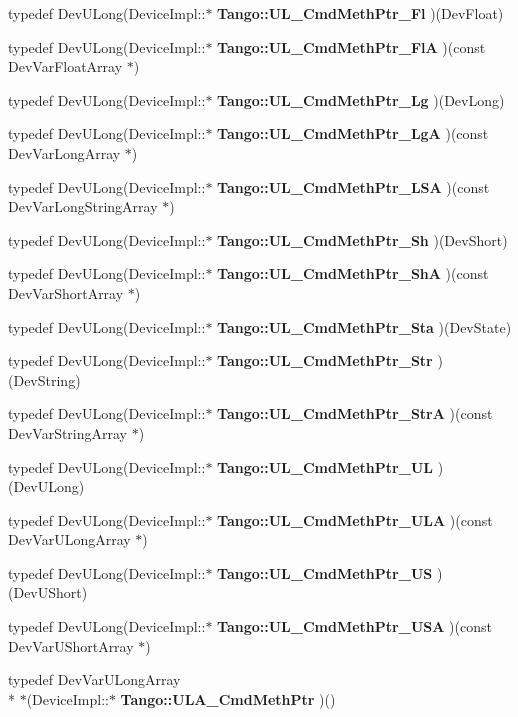\begin{DoxyCompactItemize}
\item 
typedef Dev\-U\-Long(Device\-Impl\-::$\ast$ {\bf Tango\-::\-U\-L\-\_\-\-Cmd\-Meth\-Ptr\-\_\-\-Fl} )(Dev\-Float)
\item 
typedef Dev\-U\-Long(Device\-Impl\-::$\ast$ {\bf Tango\-::\-U\-L\-\_\-\-Cmd\-Meth\-Ptr\-\_\-\-Fl\-A} )(const Dev\-Var\-Float\-Array $\ast$)
\item 
typedef Dev\-U\-Long(Device\-Impl\-::$\ast$ {\bf Tango\-::\-U\-L\-\_\-\-Cmd\-Meth\-Ptr\-\_\-\-Lg} )(Dev\-Long)
\item 
typedef Dev\-U\-Long(Device\-Impl\-::$\ast$ {\bf Tango\-::\-U\-L\-\_\-\-Cmd\-Meth\-Ptr\-\_\-\-Lg\-A} )(const Dev\-Var\-Long\-Array $\ast$)
\item 
typedef Dev\-U\-Long(Device\-Impl\-::$\ast$ {\bf Tango\-::\-U\-L\-\_\-\-Cmd\-Meth\-Ptr\-\_\-\-L\-S\-A} )(const Dev\-Var\-Long\-String\-Array $\ast$)
\item 
typedef Dev\-U\-Long(Device\-Impl\-::$\ast$ {\bf Tango\-::\-U\-L\-\_\-\-Cmd\-Meth\-Ptr\-\_\-\-Sh} )(Dev\-Short)
\item 
typedef Dev\-U\-Long(Device\-Impl\-::$\ast$ {\bf Tango\-::\-U\-L\-\_\-\-Cmd\-Meth\-Ptr\-\_\-\-Sh\-A} )(const Dev\-Var\-Short\-Array $\ast$)
\item 
typedef Dev\-U\-Long(Device\-Impl\-::$\ast$ {\bf Tango\-::\-U\-L\-\_\-\-Cmd\-Meth\-Ptr\-\_\-\-Sta} )(Dev\-State)
\item 
typedef Dev\-U\-Long(Device\-Impl\-::$\ast$ {\bf Tango\-::\-U\-L\-\_\-\-Cmd\-Meth\-Ptr\-\_\-\-Str} )(Dev\-String)
\item 
typedef Dev\-U\-Long(Device\-Impl\-::$\ast$ {\bf Tango\-::\-U\-L\-\_\-\-Cmd\-Meth\-Ptr\-\_\-\-Str\-A} )(const Dev\-Var\-String\-Array $\ast$)
\item 
typedef Dev\-U\-Long(Device\-Impl\-::$\ast$ {\bf Tango\-::\-U\-L\-\_\-\-Cmd\-Meth\-Ptr\-\_\-\-U\-L} )(Dev\-U\-Long)
\item 
typedef Dev\-U\-Long(Device\-Impl\-::$\ast$ {\bf Tango\-::\-U\-L\-\_\-\-Cmd\-Meth\-Ptr\-\_\-\-U\-L\-A} )(const Dev\-Var\-U\-Long\-Array $\ast$)
\item 
typedef Dev\-U\-Long(Device\-Impl\-::$\ast$ {\bf Tango\-::\-U\-L\-\_\-\-Cmd\-Meth\-Ptr\-\_\-\-U\-S} )(Dev\-U\-Short)
\item 
typedef Dev\-U\-Long(Device\-Impl\-::$\ast$ {\bf Tango\-::\-U\-L\-\_\-\-Cmd\-Meth\-Ptr\-\_\-\-U\-S\-A} )(const Dev\-Var\-U\-Short\-Array $\ast$)
\item 
typedef Dev\-Var\-U\-Long\-Array \\*
$\ast$(Device\-Impl\-::$\ast$ {\bf Tango\-::\-U\-L\-A\-\_\-\-Cmd\-Meth\-Ptr} )()

\end{DoxyCompactItemize}
